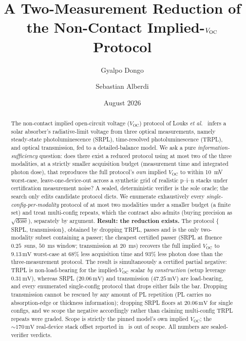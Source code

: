 \documentclass[11pt]{article}
\title{A Two-Measurement Reduction of the Non-Contact Implied-$\Voc$ Protocol}
\author{Gyalpo Dongo \and Sebastian Alberdi}
\date{August 2026}
\newcommand{\Voc}{V_{\mathrm{OC}}}
\newcommand{\mV}{\,\mathrm{mV}}
\begin{document}
\maketitle

\begin{abstract}
The non-contact implied open-circuit voltage ($\Voc$) protocol of Louks \emph{et al.}~\cite{louks2025} infers a solar absorber's radiative-limit voltage from three optical measurements, namely steady-state photoluminescence (SRPL), time-resolved photoluminescence (TRPL), and optical transmission, fed to a detailed-balance model. We ask a pure \emph{information-sufficiency} question: does there exist a reduced protocol using at most two of the three modalities, at a strictly smaller acquisition budget (measurement time and integrated photon dose), that reproduces the full protocol's \emph{own} implied $\Voc$ to within 10~mV worst-case, leave-one-device-out across a synthetic grid of realistic p--i--n stacks under certification measurement noise? A sealed, deterministic verifier is the sole oracle; the search only edits candidate protocol dicts. We enumerate exhaustively every \emph{single-config-per-modality} protocol of at most two modalities under a smaller budget (a finite set) and treat multi-config repeats, which the contract also admits (buying precision as $\sqrt{\text{dose}}$), separately by argument. \textbf{Result: the reduction exists.} The protocol $\{$SRPL, transmission$\}$, obtained by dropping TRPL, passes and is the only two-modality subset containing a passer; the cheapest certified passer (SRPL at fluence $0.25$~suns, $50$~ms window; transmission at $20$~ms) recovers the full implied $\Voc$ to $9.13\mV$ worst-case at $68\%$ less acquisition time and $93\%$ less photon dose than the three-measurement protocol. The result is simultaneously a certified partial negative: TRPL is non-load-bearing for the implied-$\Voc$ scalar \emph{by construction} (setup leverage $0.31\mV$), whereas SRPL ($20.06\mV$) and transmission ($47.25\mV$) are load-bearing, and every enumerated single-config protocol that drops either fails the bar. Dropping transmission cannot be rescued by any amount of PL repetition (PL carries no absorption-edge or thickness information); dropping SRPL floors at $20.06\mV$ for single configs, and we scope the negative accordingly rather than claiming multi-config TRPL repeats were graded. Scope is strictly the pinned model's own implied $\Voc$; the ${\sim}170\mV$ real-device stack offset reported in~\cite{louks2025} is out of scope. All numbers are sealed-verifier verdicts.
\end{abstract}
\end{document}
